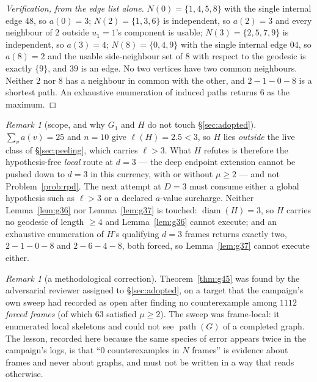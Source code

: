 \documentclass[11pt]{article}
\theoremstyle{plain}
\theoremstyle{definition}
\theoremstyle{remark}
\newtheorem{remark}[theorem]{Remark}
\numberwithin{equation}{section}
\newcommand{\diam}{\operatorname{diam}}
\newcommand{\pth}{\operatorname{path}}
\begin{document}
\begin{proof}[Verification, from the edge list alone]
$N(0) = \{1,4,5,8\}$ with the single internal edge $48$, so $a(0) = 3$; $N(2) = \{1,3,6\}$
is independent, so $a(2) = 3$ and every neighbour of $2$ outside $u_1 = 1$'s component is
usable; $N(3) = \{2,5,7,9\}$ is independent, so $a(3) = 4$; $N(8) = \{0,4,9\}$ with the
single internal edge $04$, so $a(8) = 2$ and the usable side-neighbour set of $8$ with
respect to the geodesic is exactly $\{9\}$, and $39$ is an edge. No two vertices have two
common neighbours. Neither $2$ nor $8$ has a neighbour in common with the other, and
$2-1-0-8$ is a shortest path. An exhaustive enumeration of induced paths returns $6$ as the
maximum.
\end{proof}

\begin{remark}[scope, and why $G_1$ and $H$ do not touch \S\ref{sec:adopted}]
$\sum_v a(v) = 25$ and $n = 10$ give $\ell(H) = 2.5 < 3$, so $H$ lies \emph{outside} the live
class of \S\ref{sec:peeling}, which carries $\ell > 3$. What $H$ refutes is therefore the
hypothesis-free \emph{local} route at $d = 3$ --- the deep endpoint extension cannot be
pushed down to $d = 3$ in this currency, with or without $\mu \ge 2$ --- and not
Problem~\ref{prob:rpd}. The next attempt at $D = 3$ must consume either a global hypothesis
such as $\ell > 3$ or a declared $a$-value surcharge. Neither Lemma~\ref{lem:g36} nor
Lemma~\ref{lem:g37} is touched: $\diam(H) = 3$, so $H$ carries no geodesic of length $\ge 4$
and Lemma~\ref{lem:g36} cannot execute; and an exhaustive enumeration of $H$'s qualifying
$d = 3$ frames returns exactly two, $2-1-0-8$ and $2-6-4-8$, both forced, so
Lemma~\ref{lem:g37} cannot execute either.
\end{remark}

\begin{remark}[a methodological correction]\label{rem:frames}
Theorem~\ref{thm:g45} was found by the adversarial reviewer assigned to \S\ref{sec:adopted},
on a target that the campaign's own sweep had recorded as open after finding no
counterexample among $1112$ \emph{forced frames} (of which $63$ satisfied $\mu \ge 2$). The
sweep was frame-local: it enumerated local skeletons and could not see $\pth(G)$ of a
completed graph. The lesson, recorded here because the same species of error appears twice in
the campaign's logs, is that ``$0$ counterexamples in $N$ frames'' is evidence about frames
and never about graphs, and must not be written in a way that reads otherwise.
\end{remark}
\end{document}
